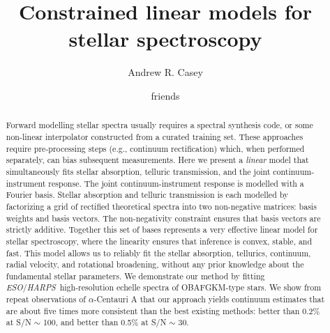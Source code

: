 \documentclass[modern]{aastex631}
\newcommand{\chosentitle}{Constrained linear models for stellar spectroscopy}
\newcommand{\project}[1]{\textit{#1}}
\newcommand{\eso}{\project{ESO}}
\newcommand{\harps}{\project{HARPS}}
\begin{document}
\title{\chosentitle}

\author[0000-0003-0174-0564]{Andrew R. Casey}

\author{friends}



\begin{abstract}\noindent
Forward modelling stellar spectra usually requires a spectral synthesis code, or some non-linear interpolator constructed from a curated training set.
These approaches require pre-processing steps (e.g., continuum rectification) which, when performed separately, can bias subsequent measurements.
Here we present a \emph{linear} model that simultaneously fits stellar absorption, telluric transmission, and the joint continuum-instrument response.
The joint continuum-instrument response is modelled with a Fourier basis. Stellar absorption and telluric transmission is each modelled by factorizing a grid of rectified theoretical spectra into two non-negative matrices: basis weights and basis vectors.
The non-negativity constraint ensures that basis vectors are strictly additive.
Together this set of bases represents a very effective linear model for stellar spectroscopy, where the linearity ensures that inference is convex, stable, and fast.
This model allows us to reliably fit the stellar absorption, tellurics, continuum, radial velocity, and rotational broadening, without any prior knowledge about the fundamental stellar parameters.
We demonstrate our method by fitting \eso/\harps\ high-resolution echelle spectra of OBAFGKM-type stars.
We show from repeat observations of $\alpha$-Centauri A that our approach yields continuum estimates that are about five times more consistent than the best existing methods: better than 0.2\% at S/N $\sim$ 100, and better than 0.5\% at S/N $\sim$ 30.
\end{abstract}
\end{document}
